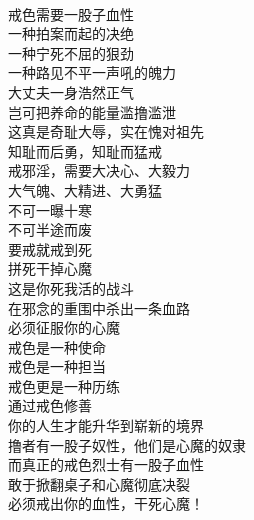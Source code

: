 \begin{poem}[戒出你的血性]
    \begin{multicols}{2}
        \begin{center}~\\
            戒色需要一股子血性 \\ 一种拍案而起的决绝 \\ 一种宁死不屈的狠劲 \\ 一种路见不平一声吼的魄力 \\ 大丈夫一身浩然正气 \\ 岂可把养命的能量滥撸滥泄 \\ 这真是奇耻大辱，实在愧对祖先 \\ 知耻而后勇，知耻而猛戒 \\ 戒邪淫，需要大决心、大毅力 \\ 大气魄、大精进、大勇猛 \\ 不可一曝十寒 \\ 不可半途而废 \\ 要戒就戒到死 \\ 拼死干掉心魔 \\ 这是你死我活的战斗 \\ 在邪念的重围中杀出一条血路 \\ 必须征服你的心魔 \\ 戒色是一种使命 \\ 戒色是一种担当 \\ 戒色更是一种历练 \\ 通过戒色修善 \\ 你的人生才能升华到崭新的境界 \\ 撸者有一股子奴性，他们是心魔的奴隶 \\ 而真正的戒色烈士有一股子血性 \\ 敢于掀翻桌子和心魔彻底决裂 \\ 必须戒出你的血性，干死心魔！
        \end{center}
    \end{multicols}
\end{poem}

